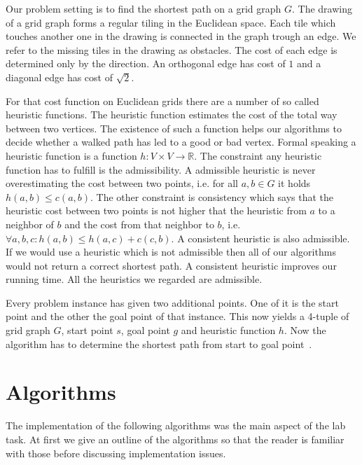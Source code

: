 \documentclass{article}
\begin{document}
    Our problem setting is to find the shortest path on a grid graph $G$. The drawing of a grid graph forms a regular tiling in the Euclidean space. Each tile which touches another one in the drawing is connected in the graph trough an edge. We refer to the missing tiles in the drawing as obstacles. The cost of each edge is determined only by the direction. An orthogonal edge has cost of $1$ and a diagonal edge has cost of $\sqrt{2}$.
    
    For that cost function on Euclidean grids there are a number of so called heuristic functions. The heuristic function estimates the cost of the total way between two vertices. The existence of such a function helps our algorithms to decide whether a walked path has led to a good or bad vertex. Formal speaking a heuristic function is a function $h : V \times V \rightarrow \mathbb{R}$. The constraint any heuristic function has to fulfill is the admissibility. A admissible heuristic is never overestimating the cost between two points, i.e. for all $a, b \in G$ it holds $h(a, b) \leq c(a,b)$. The other constraint is consistency which says that the heuristic cost between two points is not higher that the heuristic from $a$ to a neighbor of $b$ and the cost from that neighbor to $b$, i.e. $\forall a, b, c: h(a, b) \leq h(a, c) + c(c, b)$. A consistent heuristic is also admissible. If we would use a heuristic which is not admissible then all of our algorithms would not return a correct shortest path. A consistent heuristic improves our running time. All the heuristics we regarded are admissible.
    
    Every problem instance has given two additional points. One of it is the start point and the other the goal point of that instance. This now yields a 4-tuple of grid graph $G$, start point $s$, goal point $g$ and heuristic function $h$. Now the algorithm has to determine the shortest path from start to goal point~\cite{DBLP:conf/aaai/HaraborG11}.
    
    
    
    \section{Algorithms}
    \label{sec:algorithms}
    
    The implementation of the following algorithms was the main aspect of the lab task. At first we give an outline of the algorithms so that the reader is familiar with those before discussing implementation issues.
    
\end{document}
